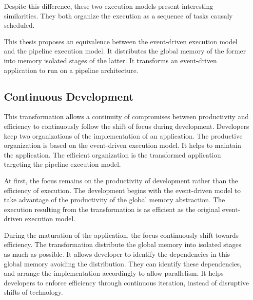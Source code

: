 Despite this difference, these two execution models present interesting similarities.
They both organize the execution as a sequence of tasks causaly scheduled. %

This thesis proposes an equivalence between the event-driven execution model and the pipeline execution model.
It distributes the global memory of the former into memory isolated stages of the latter.
It transforms an event-driven application to run on a pipeline architecture.

\subsection{Continuous Development}

This transformation allows a continuity of compromises between productivity and efficiency to continuously follow the shift of focus during development.
Developers keep two organizations of the implementation of an application. %
The productive organization is based on the event-driven execution model.
It helps to maintain the application.
The efficient organization is the transformed application targeting the pipeline execution model.

At first, the focus remains on the productivity of development rather than the efficiency of execution.
The development begins with the event-driven model to take advantage of the productivity of the global memory abstraction.
The execution resulting from the transformation is as efficient as the original event-driven execution model.

During the maturation of the application, the focus continuously shift towards efficiency.
The transformation distribute the global memory into isolated stages as much as possible.
It allows developer to identify the dependencies in this global memory avoiding the distribution.
They can identify these dependencies, and arrange the implementation accordingly to allow parallelism.
It helps developers to enforce efficiency through continuous iteration, instead of disruptive shifts of technology.

